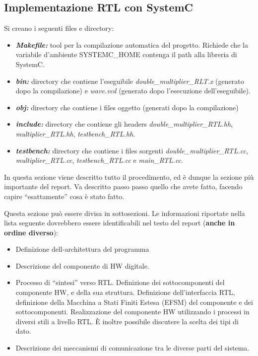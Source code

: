 \documentclass[]{IEEEtran}
\begin{document}
\subsection{Implementazione RTL con SystemC}
Si creano i seguenti files e directory:
\begin{itemize}
\item {\it\bf Makefile:} tool per la compilazione automatica del progetto. Richiede che la variabile d'ambiente SYSTEMC_HOME contenga il path alla libreria di SystemC.
\item {\it\bf bin:} directory che contiene l'eseguibile {\it double_multiplier_RLT.x} (generato dopo la compilazione) e {\it wave.vcd} (generato dopo l'esecuzione dell'eseguibile).
\item {\it\bf obj:} directory che contiene i files oggetto (generati dopo la compilazione)
\item {\it\bf include:} directory che contiene gli headers {\it double_multiplier_RTL.hh}, {\it multiplier_RTL.hh}, {\it testbench_RTL.hh}.
\item {\it\bf testbench:} directory che contiene i files sorgenti {\it double_multiplier_RTL.cc}, {\it multiplier_RTL.cc}, {\it testbench_RTL.cc} e {\it main_RTL.cc}.
\end{itemize}


In questa sezione viene descritto tutto il procedimento, ed è dunque la sezione più importante del report. Va descritto passo passo quello che avete fatto, facendo capire ``esattamente'' cosa è stato fatto.

Questa sezione può essere divisa in sottosezioni. Le informazioni riportate nella lista seguente dovrebbero essere identificabili nel testo del report (\textbf{anche in ordine diverso}):
\begin{itemize}
\item Definizione dell-architettura del programma
\item Descrizione del componente di HW digitale.
\item Processo di ``sintesi'' verso RTL. Definizione dei sottocomponenti del componente HW, e della sua struttura. Definizione dell'interfaccia RTL, definizione della Macchina a Stati Finiti Estesa (EFSM) del componente e dei sottocomponenti. Realizzazione del componente HW utilizzando i processi in diversi stili a livello RTL. \`E inoltre possibile discutere la scelta dei tipi di dato.
\item Descrizione dei meccanismi di comunicazione tra le diverse parti del sistema.
\end{itemize}
\end{document}

